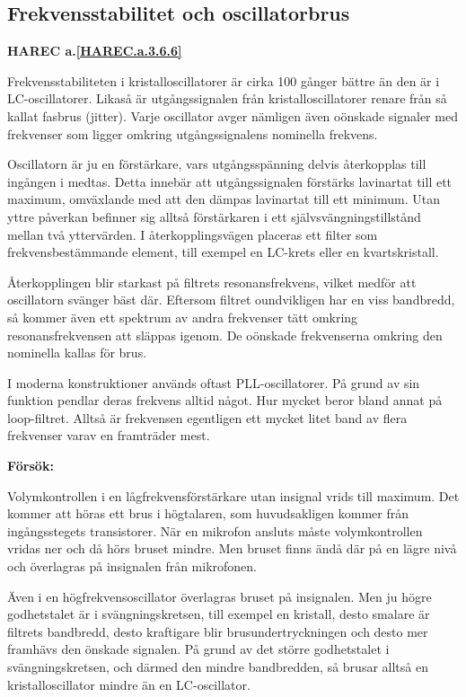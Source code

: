 \subsection{Frekvensstabilitet och oscillatorbrus}
\textbf{HAREC a.\ref{HAREC.a.3.6.6}\label{myHAREC.a.3.6.6}}

Frekvensstabiliteten i kristalloscillatorer är cirka 100 gånger bättre än
den är i LC-oscillatorer.
Likaså är utgångssignalen från kristalloscillatorer renare från så kallat
fasbrus (jitter).
Varje oscillator avger nämligen även oönskade signaler med frekvenser som
ligger omkring utgångssignalens nominella frekvens.

Oscillatorn är ju en förstärkare, vars utgångsspänning delvis
återkopplas till ingången i medtas.
Detta innebär att utgångssignalen förstärks lavinartat till ett maximum,
omväxlande med att den dämpas lavinartat till ett minimum.
Utan yttre påverkan befinner sig alltså förstärkaren i ett
självsvängningstillstånd mellan två yttervärden.
I återkopplingsvägen placeras ett filter som frekvensbestämmande
element, till exempel en LC-krets eller en kvartskristall.

Återkopplingen blir starkast på filtrets resonansfrekvens, vilket
medför att oscillatorn svänger bäst där.
Eftersom filtret oundvikligen har en viss bandbredd, så kommer även ett
spektrum av andra frekvenser tätt omkring resonansfrekvensen att släppas
igenom.
De oönskade frekvenserna omkring den nominella kallas för brus.

I moderna konstruktioner används oftast PLL-oscillatorer.
På grund av sin funktion pendlar deras frekvens alltid något.
Hur mycket beror bland annat på loop-filtret.
Alltså är frekvensen egentligen ett mycket litet band av flera frekvenser varav
en framträder mest.

\textbf{Försök:}

Volymkontrollen i en lågfrekvensförstärkare utan insignal vrids till maximum.
Det kommer att höras ett brus i högtalaren, som huvudsakligen kommer från
ingångsstegets transistorer.
När en mikrofon ansluts måste volymkontrollen vridas ner och då hörs bruset
mindre.
Men bruset finns ändå där på en lägre nivå och överlagras på insignalen från
mikrofonen.

Även i en högfrekvensoscillator överlagras bruset på insignalen.
Men ju högre godhetstalet är i svängningskretsen, till exempel en kristall, desto
smalare är filtrets bandbredd, desto kraftigare blir brusundertryckningen och
desto mer framhävs den önskade signalen.
På grund av det större godhetstalet i svängningskretsen, och därmed den mindre
bandbredden, så brusar alltså en kristalloscillator mindre än en LC-oscillator.

